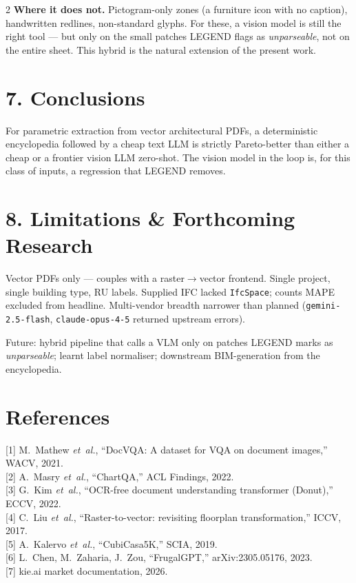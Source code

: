 \documentclass[a0,portrait]{a0poster}
\begin{document}
\begin{multicols}{2}
\textbf{Where it does not.} Pictogram-only zones (a furniture icon with no
caption), handwritten redlines, non-standard glyphs. For these, a vision
model is still the right tool --- but only on the small patches LEGEND flags
as \emph{unparseable}, not on the entire sheet. This hybrid is the natural
extension of the present work.

\color{SaddleBrown}
\section*{7. Conclusions}
For parametric extraction from vector architectural PDFs, a deterministic
encyclopedia followed by a cheap text LLM is strictly Pareto-better than
either a cheap or a frontier vision LLM zero-shot. The vision model in the
loop is, for this class of inputs, a regression that LEGEND removes.
\color{Black}

\section*{8. Limitations \& Forthcoming Research}
Vector PDFs only --- couples with a raster$\to$vector frontend. Single
project, single building type, RU labels. Supplied IFC lacked
\texttt{IfcSpace}; counts MAPE excluded from headline. Multi-vendor breadth
narrower than planned (\texttt{gemini-2.5-flash}, \texttt{claude-opus-4-5}
returned upstream errors).

Future: hybrid pipeline that calls a VLM only on patches LEGEND marks as
\emph{unparseable}; learnt label normaliser; downstream BIM-generation from
the encyclopedia.

\section*{References}
{\small
[1] M.~Mathew \emph{et~al.}, ``DocVQA: A dataset for VQA on document images,''
WACV, 2021.\\[0.15em]
[2] A.~Masry \emph{et~al.}, ``ChartQA,'' ACL Findings, 2022.\\[0.15em]
[3] G.~Kim \emph{et~al.}, ``OCR-free document understanding transformer
(Donut),'' ECCV, 2022.\\[0.15em]
[4] C.~Liu \emph{et~al.}, ``Raster-to-vector: revisiting floorplan
transformation,'' ICCV, 2017.\\[0.15em]
[5] A.~Kalervo \emph{et~al.}, ``CubiCasa5K,'' SCIA, 2019.\\[0.15em]
[6] L.~Chen, M.~Zaharia, J.~Zou, ``FrugalGPT,'' arXiv:2305.05176, 2023.\\[0.15em]
[7] kie.ai market documentation, 2026.}

\end{multicols}
\end{document}
